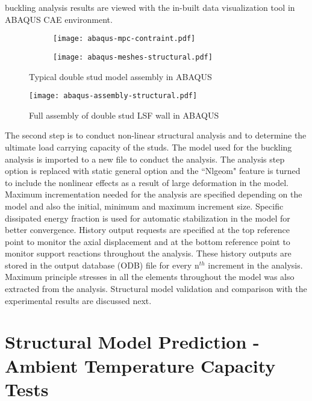 buckling analysis results are viewed with the in-built data visualization tool in ABAQUS CAE environment.
\begin{figure}[!htbp]
	\centering
	\begin{subfigure}[b]{0.4\textwidth}
		\centering
		\texttt{[image: abaqus-mpc-contraint.pdf]}
		\caption{}
		\label{subfig:abaqus-mpc-contraint}
	\end{subfigure}
	\begin{subfigure}[b]{0.4\textwidth}
		\centering
		\texttt{[image: abaqus-meshes-structural.pdf]}
		\caption{}
		\label{subfig:abaqus-meshes-structural}
	\end{subfigure}
	   \caption{Typical double stud model assembly in ABAQUS}
	   \label{fig:abaqus-typical-model}
\end{figure}
\begin{figure}[!htbp]
	\centering
			\texttt{[image: abaqus-assembly-structural.pdf]}\\
		\caption{Full assembly of double stud LSF wall in ABAQUS}
		\label{fig:abaqus-full-assembly}
\end{figure}

The second step is to conduct non-linear structural analysis and to determine the ultimate load carrying capacity of the studs. The model used for the buckling analysis is imported to a new file to conduct the analysis. The analysis step option is replaced with static general option and the ``Nlgeom" feature is turned to include the nonlinear effects as a result of large deformation in the model. Maximum incrementation needed for the analysis are specified depending on the model and also the initial, minimum and maximum increment size. Specific dissipated energy fraction is used for automatic stabilization in the model for better convergence. History output requests are specified at the top reference point to monitor the axial displacement and at the bottom reference point to monitor support reactions throughout the analysis. These history outputs are stored in the output database (ODB) file for every n\(^{th}\) increment in the analysis. Maximum principle stresses in all the elements throughout the model was also extracted from the analysis. Structural model validation and comparison with the experimental results are discussed next.

\section{Structural Model Prediction - Ambient Temperature Capacity Tests}

